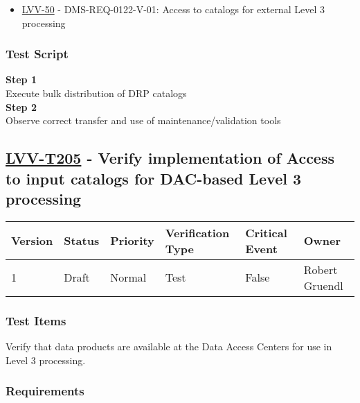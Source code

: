 \begin{itemize}
\tightlist
\item
  \href{https://jira.lsstcorp.org/browse/LVV-50}{LVV-50} -
  DMS-REQ-0122-V-01: Access to catalogs for external Level 3 processing
\end{itemize}

\subsubsection{Test Script}\label{test-script-62}

\textbf{Step 1}\\
Execute bulk distribution of DRP catalogs\\[2\baselineskip]\textbf{Step
2}\\
Observe correct transfer and use of maintenance/validation
tools\\[2\baselineskip]

\hypertarget{lvv-t205---verify-implementation-of-access-to-input-catalogs-for-dac-based-level-3-processing}{\subsection{\texorpdfstring{\href{https://jira.lsstcorp.org/secure/Tests.jspa\#/testCase/LVV-T205}{LVV-T205}
- Verify implementation of Access to input catalogs for DAC-based Level
3
processing}{LVV-T205 - Verify implementation of Access to input catalogs for DAC-based Level 3 processing}}\label{lvv-t205---verify-implementation-of-access-to-input-catalogs-for-dac-based-level-3-processing}}

\begin{longtable}[]{@{}llllll@{}}
\toprule
Version & Status & Priority & Verification Type & Critical Event &
Owner\tabularnewline
\midrule
\endhead
1 & Draft & Normal & Test & False & Robert Gruendl\tabularnewline
\bottomrule
\end{longtable}

\subsubsection{Test Items}\label{test-items-62}

Verify that data products are available at the Data Access Centers for
use in Level 3 processing.

\subsubsection{Requirements}\label{requirements-63}

